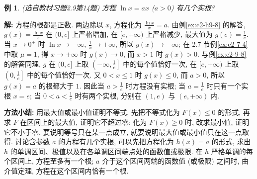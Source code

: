 \documentclass[UTF8,openany]{ctexbook}
\theoremstyle{chinesetextbook}
\newtheorem{example}{例}[section]
\newenvironment{cnsolution}{\par\indent\textbf{解:} \ignorespaces}{\par}
\begin{document}
\begin{center}
\end{center}

\begin{example}\label{ex:c2-h9-14}
\textnormal{(选自教材习题2.9第14题)} 方程 $\ln x=ax$ ($a>0$) 有几个实根?
\end{example}
\begin{cnsolution}
方程的根都是正数. 两边除以 $x$, 方程化为 $\displaystyle\frac{\ln x}x=a$. 由例\ref{ex:c2-h9-8} 的解答, $\displaystyle g(x)=\frac{\ln x}x$ 在 $(0,e]$ 上严格增加, 在 $[e,+\infty)$ 上严格减少, 最大值为 $\displaystyle g(e)=\frac1e$. 当 $x\to0^+$ 时 $\ln x\to-\infty$, $\displaystyle\frac1x\to+\infty$, 所以 $g(x)\to-\infty$; 在 2.7 节例\ref{ex:c2-7-4} 中取 $\mu=1$, 得 $x\to+\infty$ 时 $g(x)\to0$, 而 $x>1$ 时 $g(x)>0$. 与例\ref{ex:c2-9-8} 的解答同理, $g$ 在 $(0,e]$ 上取 $\displaystyle\left(-\infty,\frac1e\right]$ 中的每个值恰好一次, 在 $[e,+\infty)$ 上取 $\displaystyle\left(0,\frac1e\right]$ 中的每个值恰好一次. 又 $0<x\le1$ 时 $g(x)\le0$, 而 $a>0$, 所以 $g(x)=a$ 的根都大于 $1$. 因此当 $\displaystyle a>\frac1e$ 时方程没有实根; 当 $\displaystyle a=\frac1e$ 时只有一个实根 $x=e$; 当 $\displaystyle0<a<\frac1e$ 时有两个实根, 分别在 $(1,e)$ 与 $(e,+\infty)$ 内.
\end{cnsolution}
\par\indent\textbf{方法小结:} 用最大值或最小值证明不等式, 先把不等式化为 $F(x)\le0$ 的形式, 再求 $F$ 在区间上的最大值, 证明它不超过零; 化为 $F(x)\ge0$ 时, 改求最小值, 证明它不小于零. 要说明等号只在某一点成立, 就要说明最大值或最小值只在这一点取得. 讨论含参数 $a$ 的方程有几个实根, 可以先把方程化为 $h(x)=a$ 的形式, 求出 $h$ 的单调区间、极值以及在各单调区间端点处的函数值或极限. 在 $h$ 严格单调的每个区间上, 方程至多有一个根; $a$ 介于这个区间两端的函数值 (或极限) 之间时, 由介值定理, 方程在这个区间内恰有一个根.
\end{document}
